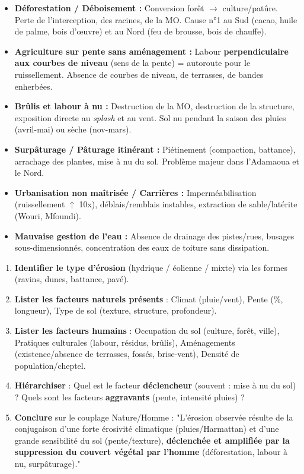 \documentclass[11pt]{article}
\newcommand{\cle}[1]{{\popxbold\color{popdark}#1}}
\begin{document}
\begin{propriete}
\begin{itemize}
    \item \textbf{Déforestation / Déboisement :} Conversion forêt $\rightarrow$ culture/patûre. Perte de l'interception, des racines, de la MO. Cause n°1 au Sud (cacao, huile de palme, bois d'œuvre) et au Nord (feu de brousse, bois de chauffe).
    \item \textbf{Agriculture sur pente sans aménagement :} Labour \textbf{perpendiculaire aux courbes de niveau} (sens de la pente) = autoroute pour le ruissellement. Absence de \cle{courbes de niveau}, de \cle{terrasses}, de \cle{bandes enherbées}.
    \item \textbf{Brûlis et labour à nu :} Destruction de la MO, destruction de la structure, exposition directe au \emph{splash} et au vent. Sol nu pendant la saison des pluies (avril-mai) ou sèche (nov-mars).
    \item \textbf{Surpâturage / Pâturage itinérant :} Piétinement (compaction, battance), arrachage des plantes, mise à nu du sol. Problème majeur dans l'Adamaoua et le Nord.
    \item \textbf{Urbanisation non maîtrisée / Carrières :} Imperméabilisation (ruissellement $\uparrow$ 10x), déblais/remblais instables, extraction de sable/latérite (Wouri, Mfoundi).
    \item \textbf{Mauvaise gestion de l'eau :} Absence de drainage des pistes/rues, busages sous-dimensionnés, concentration des eaux de toiture sans dissipation.
\end{itemize}
\end{propriete}

\begin{methode}
\begin{enumerate}
    \item \textbf{Identifier le type d'érosion} (hydrique / éolienne / mixte) via les formes (ravins, dunes, battance, pavé).
    \item \textbf{Lister les facteurs naturels présents} : Climat (pluie/vent), Pente (\%, longueur), Type de sol (texture, structure, profondeur).
    \item \textbf{Lister les facteurs humains} : Occupation du sol (culture, forêt, ville), Pratiques culturales (labour, résidus, brûlis), Aménagements (existence/absence de terrasses, fossés, brise-vent), Densité de population/cheptel.
    \item \textbf{Hiérarchiser} : Quel est le facteur \textbf{déclencheur} (souvent : mise à nu du sol) ? Quels sont les facteurs \textbf{aggravants} (pente, intensité pluies) ?
    \item \textbf{Conclure} sur le couplage Nature/Homme : "L'érosion observée résulte de la conjugaison d'une forte érosivité climatique (pluies/Harmattan) et d'une grande sensibilité du sol (pente/texture), \textbf{déclenchée et amplifiée par la suppression du couvert végétal par l'homme} (déforestation, labour à nu, surpâturage)."
\end{enumerate}
\end{methode}
\end{document}
